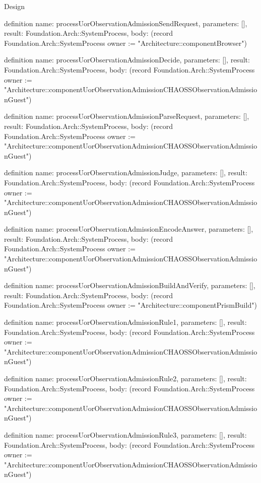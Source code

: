 \begin{lexlean}{Design}
\begin{semanticmodule}
definition{
  name: processUorObservationAdmissionSendRequest,
  parameters: [],
  result: Foundation.Arch::SystemProcess,
  body: (record Foundation.Arch::SystemProcess {owner := "Architecture::componentBrowser"})
}

definition{
  name: processUorObservationAdmissionDecide,
  parameters: [],
  result: Foundation.Arch::SystemProcess,
  body: (record Foundation.Arch::SystemProcess {owner := "Architecture::componentUorObservationAdmissionCHAOSSObservationAdmissionGuest"})
}

definition{
  name: processUorObservationAdmissionParseRequest,
  parameters: [],
  result: Foundation.Arch::SystemProcess,
  body: (record Foundation.Arch::SystemProcess {owner := "Architecture::componentUorObservationAdmissionCHAOSSObservationAdmissionGuest"})
}

definition{
  name: processUorObservationAdmissionJudge,
  parameters: [],
  result: Foundation.Arch::SystemProcess,
  body: (record Foundation.Arch::SystemProcess {owner := "Architecture::componentUorObservationAdmissionCHAOSSObservationAdmissionGuest"})
}

definition{
  name: processUorObservationAdmissionEncodeAnswer,
  parameters: [],
  result: Foundation.Arch::SystemProcess,
  body: (record Foundation.Arch::SystemProcess {owner := "Architecture::componentUorObservationAdmissionCHAOSSObservationAdmissionGuest"})
}

definition{
  name: processUorObservationAdmissionBuildAndVerify,
  parameters: [],
  result: Foundation.Arch::SystemProcess,
  body: (record Foundation.Arch::SystemProcess {owner := "Architecture::componentPrismBuild"})
}

definition{
  name: processUorObservationAdmissionRule1,
  parameters: [],
  result: Foundation.Arch::SystemProcess,
  body: (record Foundation.Arch::SystemProcess {owner := "Architecture::componentUorObservationAdmissionCHAOSSObservationAdmissionGuest"})
}

definition{
  name: processUorObservationAdmissionRule2,
  parameters: [],
  result: Foundation.Arch::SystemProcess,
  body: (record Foundation.Arch::SystemProcess {owner := "Architecture::componentUorObservationAdmissionCHAOSSObservationAdmissionGuest"})
}

definition{
  name: processUorObservationAdmissionRule3,
  parameters: [],
  result: Foundation.Arch::SystemProcess,
  body: (record Foundation.Arch::SystemProcess {owner := "Architecture::componentUorObservationAdmissionCHAOSSObservationAdmissionGuest"})
}


\end{semanticmodule}
\end{lexlean}
